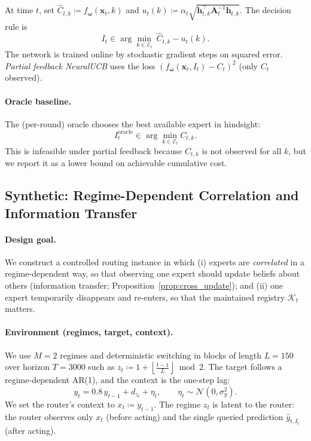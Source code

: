 At time \(t\), set
\(
\widehat{C}_{t,k}\coloneqq f_{\boldsymbol{\omega}}(\mathbf{x}_t,k)
\)
and
\(
u_t(k)\coloneqq \alpha_t\sqrt{\mathbf{h}_{t,k}^\top \mathbf{A}_t^{-1}\mathbf{h}_{t,k}}.
\)
The decision rule is
\[
I_t \in \arg\min_{k\in\mathcal{E}_t}\ \widehat{C}_{t,k}-u_t(k).
\]
The network is trained online by stochastic gradient steps on squared error.
\emph{Partial feedback NeuralUCB} uses the loss \((f_{\boldsymbol{\omega}}(\mathbf{x}_t,I_t)-C_t)^2\) (only \(C_t\) observed).

\paragraph{Oracle baseline.}
The (per-round) oracle chooses the best available expert in hindsight:
\[
I_t^{\mathrm{oracle}} \in \arg\min_{k\in\mathcal{E}_t} C_{t,k}.
\]
This is infeasible under partial feedback because \(C_{t,k}\) is not observed for all \(k\), but we
report it as a lower bound on achievable cumulative cost.


\subsection{Synthetic: Regime-Dependent Correlation and Information Transfer}
\label{sec:exp_synthetic_transfer_appendix}

\paragraph{Design goal.}
We construct a controlled routing instance in which (i) experts are \emph{correlated} in a
regime-dependent way, so that observing one expert should update beliefs about others (information
transfer; Proposition~\ref{prop:cross_update}); and (ii) one expert temporarily disappears and
re-enters, so that the maintained registry \(\mathcal{K}_t\) matters.

\paragraph{Environment (regimes, target, context).}
We use \(M=2\) regimes and deterministic switching in blocks of length \(L=150\) over horizon
\(T=3000\) such as $z_t \coloneqq 1 + \left\lfloor \frac{t-1}{L}\right\rfloor \bmod 2$.
The target follows a regime-dependent AR(1), and the context is the one-step lag:
\begin{equation}
\label{eq:exp_tri_cycle_ts_appendix}
y_t = 0.8\,y_{t-1} + d_{z_t} + \eta_t,\qquad \eta_t\sim\mathcal{N}(0,\sigma_y^2).
\end{equation}
We set the router's context to \(x_t\coloneqq y_{t-1}\).
The regime \(z_t\) is latent to the router: the router observes only \(x_t\) (before acting) and the
single queried prediction \(\hat y_{t,I_t}\) (after acting).

